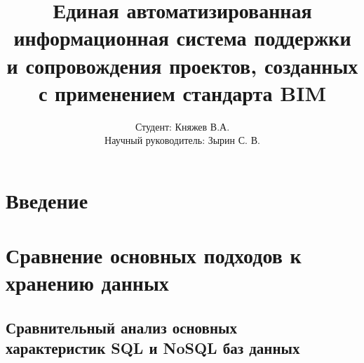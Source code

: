 \documentclass[14pt, a4paper, russian]{report}
\title{Единая автоматизированная информационная система поддержки и сопровождения проектов, созданных с применением стандарта BIM}
\author{Студент: Княжев В.А. \\ Научный руководитель: Зырин С. В.}
\begin{document}
\maketitle

\newpage

\tableofcontents
\chapter*{Введение}


\newpage

\chapter{Сравнение основных подходов к хранению данных}

\section{Сравнительный анализ  основных \\ характеристик SQL и NoSQL баз данных}
\end{document}
